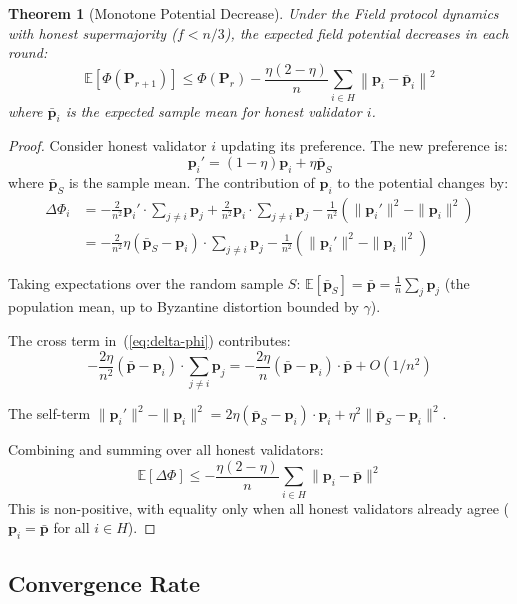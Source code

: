 \documentclass[11pt,a4paper]{article}
\newtheorem{theorem}{Theorem}[section]
\begin{document}
\begin{theorem}[Monotone Potential Decrease]
\label{thm:potential}
Under the Field protocol dynamics with honest supermajority ($f < n/3$), the expected
field potential decreases in each round:
\[
\mathbb{E}[\Phi(\mathbf{P}_{r+1})] \leq \Phi(\mathbf{P}_r) - \frac{\eta(2-\eta)}{n} \sum_{i \in H} \left\| \mathbf{p}_i - \bar{\mathbf{p}}_i \right\|^2
\]
where $\bar{\mathbf{p}}_i$ is the expected sample mean for honest validator $i$.
\end{theorem}

\begin{proof}
Consider honest validator $i$ updating its preference. The new preference is:
\[
\mathbf{p}_i' = (1 - \eta)\mathbf{p}_i + \eta \bar{\mathbf{p}}_S
\]
where $\bar{\mathbf{p}}_S$ is the sample mean. The contribution of $\mathbf{p}_i$ to the
potential changes by:
\begin{align}
\Delta \Phi_i &= -\frac{2}{n^2} \mathbf{p}_i' \cdot \sum_{j \neq i} \mathbf{p}_j + \frac{2}{n^2} \mathbf{p}_i \cdot \sum_{j \neq i} \mathbf{p}_j - \frac{1}{n^2}(\|\mathbf{p}_i'\|^2 - \|\mathbf{p}_i\|^2) \nonumber \\
&= -\frac{2}{n^2} \eta(\bar{\mathbf{p}}_S - \mathbf{p}_i) \cdot \sum_{j \neq i} \mathbf{p}_j - \frac{1}{n^2}(\|\mathbf{p}_i'\|^2 - \|\mathbf{p}_i\|^2) \label{eq:delta-phi}
\end{align}

Taking expectations over the random sample $S$:
$\mathbb{E}[\bar{\mathbf{p}}_S] = \bar{\mathbf{p}} = \frac{1}{n}\sum_{j} \mathbf{p}_j$
(the population mean, up to Byzantine distortion bounded by $\gamma$).

The cross term in~(\ref{eq:delta-phi}) contributes:
\[
-\frac{2\eta}{n^2} (\bar{\mathbf{p}} - \mathbf{p}_i) \cdot \sum_{j \neq i} \mathbf{p}_j
= -\frac{2\eta}{n} (\bar{\mathbf{p}} - \mathbf{p}_i) \cdot \bar{\mathbf{p}} + O(1/n^2)
\]

The self-term $\|\mathbf{p}_i'\|^2 - \|\mathbf{p}_i\|^2 = 2\eta(\bar{\mathbf{p}}_S - \mathbf{p}_i) \cdot \mathbf{p}_i + \eta^2\|\bar{\mathbf{p}}_S - \mathbf{p}_i\|^2$.

Combining and summing over all honest validators:
\[
\mathbb{E}[\Delta \Phi] \leq -\frac{\eta(2-\eta)}{n} \sum_{i \in H} \|\mathbf{p}_i - \bar{\mathbf{p}}\|^2
\]
This is non-positive, with equality only when all honest validators already agree
($\mathbf{p}_i = \bar{\mathbf{p}}$ for all $i \in H$).
\end{proof}

\subsection{Convergence Rate}
\end{document}
